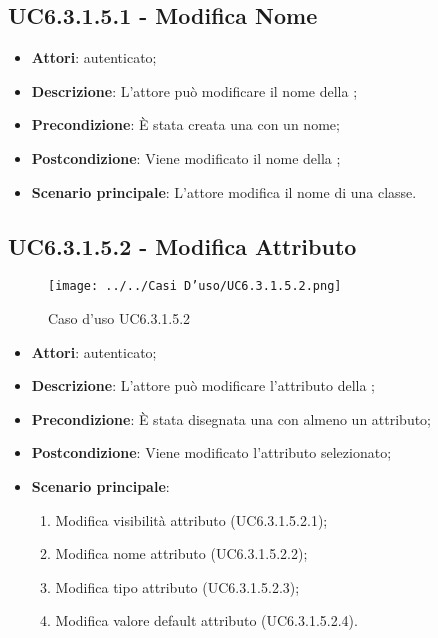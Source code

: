 \subsection{UC6.3.1.5.1 - Modifica Nome}
\label{ssec:UC6.3.1.5.1}
\begin{itemize}
\item \textbf{Attori}:  autenticato;
\item \textbf{Descrizione}: L'attore può modificare il nome della ;
\item \textbf{Precondizione}: È stata creata una  con un nome;
\item \textbf{Postcondizione}: Viene modificato il nome della ;
\item \textbf{Scenario principale}: L'attore modifica il nome di una classe.
\end{itemize}
\subsection{UC6.3.1.5.2 - Modifica Attributo}
\label{ssec:UC6.3.1.5.2}
\begin{figure}[h!]
\centering
\texttt{[image: ../../Casi D'uso/UC6.3.1.5.2.png]}
\caption{Caso d'uso UC6.3.1.5.2}
 \end{figure}
\begin{itemize}
\item \textbf{Attori}:  autenticato;
\item \textbf{Descrizione}: L'attore può modificare l'attributo della ;
\item \textbf{Precondizione}: È stata disegnata una  con almeno un attributo;
\item \textbf{Postcondizione}: Viene modificato l'attributo selezionato;
\item \textbf{Scenario principale}: \begin{enumerate}\item Modifica visibilità attributo (UC6.3.1.5.2.1);\item Modifica nome attributo (UC6.3.1.5.2.2);\item Modifica tipo attributo (UC6.3.1.5.2.3);\item Modifica valore default attributo (UC6.3.1.5.2.4).
 \end{enumerate}
\end{itemize}
